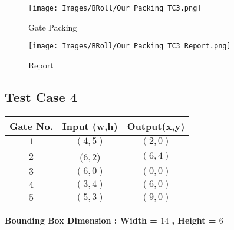\documentclass[12pt, a4paper,openany]{article}
\begin{document}
\begin{figure}[ht]
    \centering
    \begin{minipage}{.6\textwidth}
          \centering
          \texttt{[image: Images/BRoll/Our\_Packing\_TC3.png]}
          \label{fig:tc-3}
          \caption{Gate Packing }
      
          \texttt{[image: Images/BRoll/Our\_Packing\_TC3\_Report.png]}
          \label{fig:tcr-3}
          \caption{Report}
          \centering 
      \end{minipage}
    \end{figure}

\newpage
\subsection{Test Case 4}
\begin{center}
\begin{tabular}{|c|c|c|}
    \hline
    \rowcolor[HTML]{DAE8FC} Gate No. &
    Input (w,h)                                    & Output(x,y)   \\ \hline
    \rowcolor[HTML]{FFFC9E} {\color[HTML]{000000}\(1\)} &
    {\color[HTML]{000000} \((4,5)\)}                         & {\color[HTML]{000000} \((2,0)\)}    \\ \hline
    \rowcolor[HTML]{FFFC9E} 
    {\color[HTML]{000000} \(2\)} &
    {\color[HTML]{000000} \((6,2\))}                         & {\color[HTML]{000000} \((6,4)\)}      \\ \hline
     \rowcolor[HTML]{FFFC9E} 
     {\color[HTML]{000000} \(3\)} &
    {\color[HTML]{000000} \((6,0)\)}                         & {\color[HTML]{000000} \((0,0)\)}      \\ \hline
      \rowcolor[HTML]{FFFC9E}  {\color[HTML]{000000}\(4\)} &
    {\color[HTML]{000000} \((3,4)\)}                         & {\color[HTML]{000000} \((6,0)\)}      \\ \hline
     \rowcolor[HTML]{FFFC9E} 
     {\color[HTML]{000000} \(5\)} &
    {\color[HTML]{000000} \((5,3)\)}                         & {\color[HTML]{000000} \((9,0)\)}      \\ \hline
    
    
\end{tabular}
\end{center}
\begin{center}
\textbf{Bounding Box Dimension : Width = \(14\) , Height = \(6\)} 
\end{center}
\end{document}
